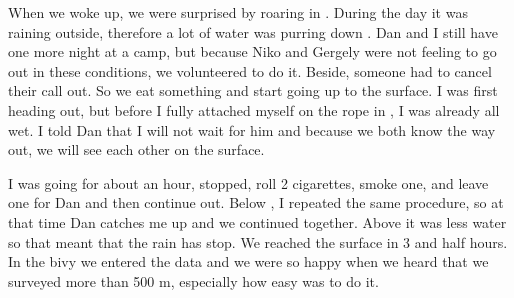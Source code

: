 

When we woke up, we were surprised by roaring in . During
the day it was raining outside, therefore a lot of water was purring
down . Dan and I still have one more night at a camp, but
because Niko and Gergely were not feeling to go out in these conditions,
we volunteered to do it. Beside, someone had to cancel their call out.
So we eat something and start going up to the surface. I was first
heading out, but before I fully attached myself on the rope in
, I was already all wet. I told Dan that I will not wait
for him and because we both know the way out, we will see each other on
the surface.


I was going for about an hour, stopped, roll 2 cigarettes,
smoke one, and leave one for Dan and then continue out. Below
, I repeated the same procedure, so at that time Dan catches
me up and we continued together. Above  it was less water so
that meant that the rain has stop. We reached the surface in 3 and half
hours. In the bivy we entered the data and we were so happy when we
heard that we surveyed more than 500 m, especially how easy was to do
it.












